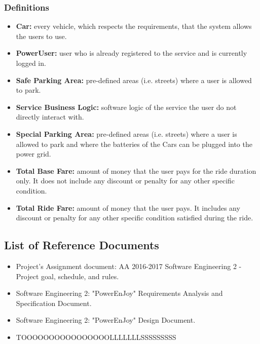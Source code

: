 \subsubsection{Definitions}
\begin{itemize}
    \item \textbf{Car:} every vehicle, which respects the requirements, that the system allows the users to use.
    \item\textbf{PowerUser:} user who is already registered to the service and is currently logged in.
    \item \textbf{Safe Parking Area:} pre-defined areas (i.e. streets) where a user is allowed to park.
    \item \textbf{Service Business Logic:} software logic of the service the user do not directly interact with.
    \item \textbf{Special Parking Area:} pre-defined areas (i.e. streets) where a user is allowed to park and where the batteries of the Cars can be plugged into the power grid.
    \item \textbf{Total Base Fare:} amount of money that the user pays for the ride duration only. It does not include any discount or penalty for any other specific condition.
    \item \textbf{Total Ride Fare:} amount of money that the user pays. It includes any discount or penalty for any other specific condition satisfied during the ride.
\end{itemize}


\subsection{List of Reference Documents}
\begin{itemize}
    \item Project’s Assignment document: AA 2016-2017 Software Engineering 2 - Project goal, schedule, and rules.
    \item Software Engineering 2: "PowerEnJoy" Requirements Analysis and Specification Document.
    \item Software Engineering 2: "PowerEnJoy" Design Document.
    \item TOOOOOOOOOOOOOOOOLLLLLLLSSSSSSSSS
\end{itemize}